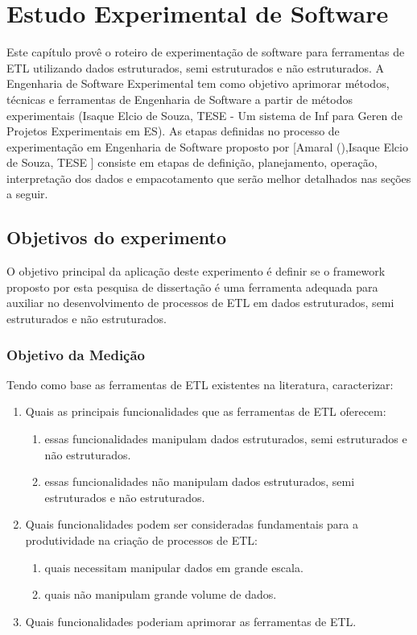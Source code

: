 \chapter{Estudo Experimental de Software}

Este capítulo provê o roteiro de experimentação de software para ferramentas de ETL utilizando dados estruturados, semi estruturados e não estruturados. A Engenharia de Software Experimental tem como objetivo aprimorar métodos, técnicas e ferramentas de Engenharia de Software a partir de métodos experimentais (Isaque Elcio de Souza, TESE - Um sistema de Inf para Geren de Projetos Experimentais em ES). As etapas definidas no processo de experimentação em Engenharia de Software proposto por [Amaral (),Isaque Elcio de Souza, TESE ] consiste em etapas de definição, planejamento, operação, interpretação dos dados e empacotamento que serão melhor detalhados nas seções a seguir.
\clearpage

\section{Objetivos do experimento}

O objetivo principal da aplicação deste experimento é definir se o framework proposto por esta pesquisa de dissertação é uma ferramenta adequada para auxiliar no desenvolvimento de processos de ETL em dados estruturados, semi estruturados e não estruturados.

\subsection{Objetivo da Medição}

Tendo como base as ferramentas de ETL existentes na literatura, caracterizar:

\begin{enumerate}
	\item Quais as principais funcionalidades que as ferramentas de ETL oferecem:
	\begin{enumerate}
		\item essas funcionalidades manipulam dados estruturados, semi estruturados e não estruturados.
		\item  essas funcionalidades não manipulam dados estruturados, semi estruturados e não estruturados.
	\end{enumerate}
	\item Quais funcionalidades podem ser consideradas fundamentais para a produtividade na criação de processos de ETL:
	\begin{enumerate}
		\item quais necessitam manipular dados em grande escala.
		\item quais não manipulam grande volume de dados.
	\end{enumerate}
	\item Quais funcionalidades poderiam aprimorar as ferramentas de ETL.
\end{enumerate}


